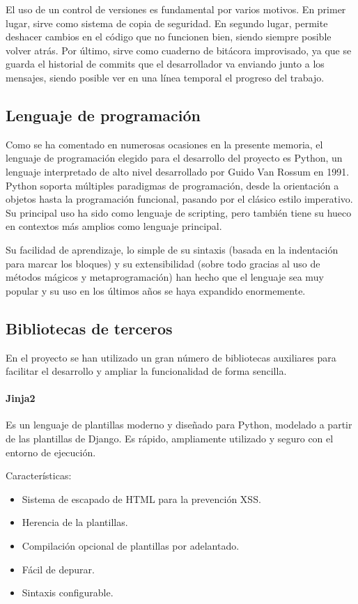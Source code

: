 El uso de un control de versiones es fundamental por varios motivos. En primer
lugar, sirve como sistema de copia de seguridad. En segundo lugar, permite deshacer
cambios en el código que no funcionen bien, siendo siempre posible volver
atrás. Por último, sirve como cuaderno de bitácora improvisado, ya que se guarda
el historial de commits que el desarrollador va enviando junto a los mensajes,
siendo posible ver en una línea temporal el progreso del trabajo.

\subsection{Lenguaje de programación}

Como se ha comentado en numerosas ocasiones en la presente memoria, el lenguaje
de programación elegido para el desarrollo del proyecto es Python, un
lenguaje interpretado de alto nivel desarrollado por Guido Van Rossum en 1991.
Python soporta múltiples paradigmas de programación, desde la orientación a objetos
hasta la programación funcional, pasando por el clásico estilo imperativo. Su
principal uso ha sido como lenguaje de scripting, pero también tiene su hueco en
contextos más amplios como lenguaje principal.

Su facilidad de aprendizaje, lo simple de su sintaxis (basada en la indentación
para marcar los bloques) y su extensibilidad (sobre todo gracias al uso de métodos
mágicos y metaprogramación) han hecho que el lenguaje sea muy popular y su uso
en los últimos años se haya expandido enormemente.

\subsection{Bibliotecas de terceros}

En el proyecto se han utilizado un gran número de bibliotecas auxiliares para
facilitar el desarrollo y ampliar la funcionalidad de forma sencilla.

\paragraph{Jinja2}
Es un lenguaje de plantillas moderno y diseñado para Python, modelado a partir de las plantillas de Django.
Es rápido, ampliamente utilizado y seguro con el entorno de ejecución.

Características:

\begin{itemize}
    \item Sistema de escapado de HTML para la prevención XSS.
    \item Herencia de la plantillas.
    \item Compilación opcional de plantillas por adelantado.
    \item Fácil de depurar.
    \item Sintaxis configurable.
\end{itemize}

